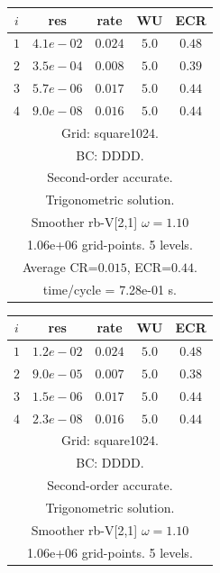 \begin{table}[hbt]
\begin{center}
{\tablefontsize
\begin{tabular}{|c|c|c|c|c|} \hline 
 $i$   & res      & rate    &  WU    & ECR  \\   \hline 
 $ 1$  & $ 4.1e-02$ & $0.024$ & $ 5.0$ & $0.48$ \\ 
 $ 2$  & $ 3.5e-04$ & $0.008$ & $ 5.0$ & $0.39$ \\ 
 $ 3$  & $ 5.7e-06$ & $0.017$ & $ 5.0$ & $0.44$ \\ 
 $ 4$  & $ 9.0e-08$ & $0.016$ & $ 5.0$ & $0.44$ \\ 
\hline 
\multicolumn{5}{|c|}{Grid: square1024.}  \\
\multicolumn{5}{|c|}{BC: DDDD.}  \\
\multicolumn{5}{|c|}{Second-order accurate.}  \\
\multicolumn{5}{|c|}{Trigonometric solution.}  \\
\multicolumn{5}{|c|}{Smoother rb-V[2,1] $\omega=1.10$}  \\
\multicolumn{5}{|c|}{1.06e+06 grid-points. 5 levels.}  \\
\multicolumn{5}{|c|}{Average CR=$0.015$, ECR=$0.44$.}  \\
\multicolumn{5}{|c|}{time/cycle = 7.28e-01 s.}  \\
\hline 
\end{tabular}
\begin{tabular}{|c|c|c|c|c|} \hline 
 $i$   & res      & rate    &  WU    & ECR  \\   \hline 
 $ 1$  & $ 1.2e-02$ & $0.024$ & $ 5.0$ & $0.48$ \\ 
 $ 2$  & $ 9.0e-05$ & $0.007$ & $ 5.0$ & $0.38$ \\ 
 $ 3$  & $ 1.5e-06$ & $0.017$ & $ 5.0$ & $0.44$ \\ 
 $ 4$  & $ 2.3e-08$ & $0.016$ & $ 5.0$ & $0.44$ \\ 
\hline 
\multicolumn{5}{|c|}{Grid: square1024.}  \\
\multicolumn{5}{|c|}{BC: DDDD.}  \\
\multicolumn{5}{|c|}{Second-order accurate.}  \\
\multicolumn{5}{|c|}{Trigonometric solution.}  \\
\multicolumn{5}{|c|}{Smoother rb-V[2,1] $\omega=1.10$}  \\
\multicolumn{5}{|c|}{1.06e+06 grid-points. 5 levels.}  \\

\end{tabular}}
\end{center}
\end{table}
